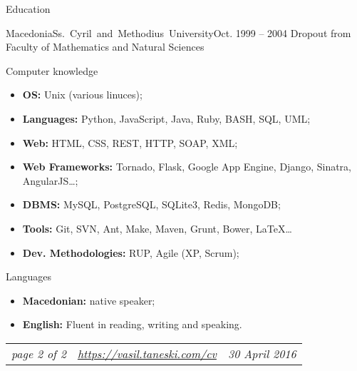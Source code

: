 \documentclass[]{mcdowellcv}
\begin{document}
    \begin{cvsection}{Education}
    \label{Education}
        \begin{cvsubsection}{Macedonia}{\mbox{Ss. Cyril and Methodius University}}{Oct. 1999 -- 2004}
            Dropout from Faculty of Mathematics and Natural Sciences
        \end{cvsubsection}
    \end{cvsection}

    \begin{cvsection}{Computer knowledge}
    \label{Computer knowledge}
        \begin{cvsubsection}{}{}{}
            \begin{itemize}
                \item \textbf{OS:} Unix (various linuces);
                \item \textbf{Languages:} Python, JavaScript, Java, Ruby, BASH, SQL, UML;
                \vspace{1mm}
                \item \textbf{Web:} HTML, CSS, REST, HTTP, SOAP, XML;
                \item \textbf{Web Frameworks:} Tornado, Flask, Google App Engine, Django, Sinatra, AngularJS\ldots;
                \vspace{1mm}
                \item \textbf{DBMS:} MySQL, PostgreSQL, SQLite3, Redis, MongoDB;
                \item \textbf{Tools:} Git, SVN, Ant, Make, Maven, Grunt, Bower, \LaTeX\ldots
                \vspace{1mm}
                \item \textbf{Dev. Methodologies:} RUP, Agile (XP, Scrum);
            \end{itemize}
        \end{cvsubsection}
    \end{cvsection}

    \begin{cvsection}{Languages}
    \label{Languages}
        \begin{cvsubsection}{}{}{}
            \begin{itemize}
                \item \textbf{Macedonian:} native speaker;
                \item \textbf{English:} Fluent in reading, writing and speaking.
            \end{itemize}
        \end{cvsubsection}
    \end{cvsection}
    \vfill
    \begin{tabu} to 1\textwidth {X[l,m] X[c,m] X[r,m]}
        \textit{page 2 of 2} &
        \textit{\url{https://vasil.taneski.com/cv}} &
        \textit{30 April 2016}
    \end{tabu}
    \clearpage
\end{document}
